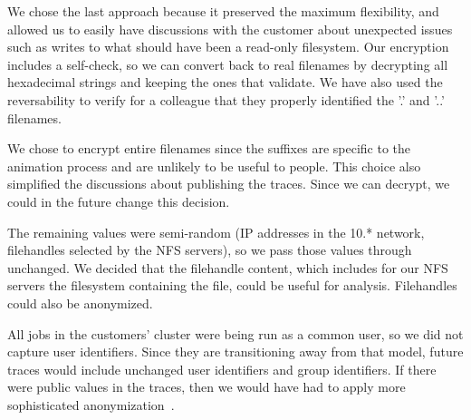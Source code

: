 We chose the last approach because it preserved the maximum
flexibility, and allowed us to easily have discussions with the
customer about unexpected issues such as writes to what should have
been a read-only filesystem.  Our encryption includes a self-check, so
we can convert back to real filenames by decrypting all hexadecimal
strings and keeping the ones that validate.  We have also used the
reversability to verify for a colleague that they properly identified
the '.' and '..' filenames.

We chose to encrypt entire filenames since the suffixes are specific
to the animation process and are unlikely to be useful to people.
This choice also simplified the discussions about publishing the
traces.  Since we can decrypt, we could in the future change this
decision.

The remaining values were semi-random (IP addresses in the 10.*
network, filehandles selected by the NFS servers), so we pass those
values through unchanged.  We decided that the filehandle content,
which includes for our NFS servers the filesystem containing the file,
could be useful for analysis.  Filehandles could also be anonymized.

All jobs in the customers' cluster were being run as a common user, so
we did not capture user identifiers.  Since they are transitioning
away from that model, future traces would include unchanged user
identifiers and group identifiers.  If there were public values in the
traces, then we would have had to apply more sophisticated
anonymization~\cite{ruoming07anonymization}.

